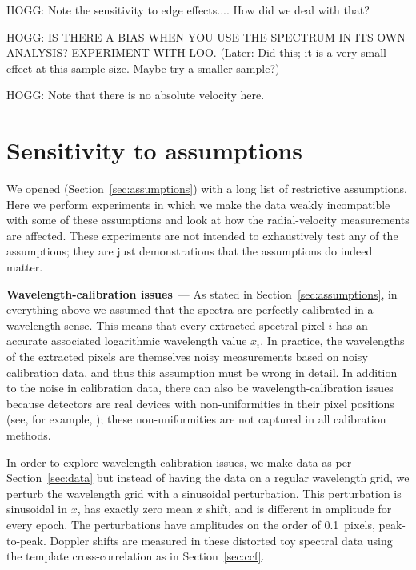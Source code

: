 \documentclass[modern]{aastex631}
\renewcommand{\paragraph}[1]{\bigskip\noindent\textbf{#1}~---}
\newcommand{\sectionname}{Section}
\newcommand{\secref}[1]{\sectionname~\ref{#1}}
\begin{document}
HOGG: Note the sensitivity to edge effects.... How did we deal with that?

HOGG: IS THERE A BIAS WHEN YOU USE THE SPECTRUM IN ITS OWN ANALYSIS? EXPERIMENT WITH LOO. (Later: Did this; it is a very small effect at this sample size. Maybe try a smaller sample?)

HOGG: Note that there is no absolute velocity here.

\section{Sensitivity to assumptions}\label{sec:sensitivity}

We opened (\secref{sec:assumptions}) with a long list of restrictive assumptions.
Here we perform experiments in which we make the data weakly incompatible with some of these assumptions and look at how the radial-velocity measurements are affected.
These experiments are not intended to exhaustively test any of the assumptions; they are just demonstrations that the assumptions do indeed matter.

\paragraph{Wavelength-calibration issues}
As stated in \secref{sec:assumptions}, in everything above we assumed that the spectra are perfectly calibrated in a wavelength sense.
This means that every extracted spectral pixel $i$ has an accurate associated logarithmic wavelength value $x_i$.
In practice, the wavelengths of the extracted pixels are themselves noisy measurements based on noisy calibration data, and thus this assumption must be wrong in detail.
In addition to the noise in calibration data, there can also be wavelength-calibration issues because detectors are real devices with non-uniformities in their pixel positions (see, for example, \citealt{excalibur}); these non-uniformities are not captured in all calibration methods.

In order to explore wavelength-calibration issues, we make data as per \secref{sec:data} but instead of having the data on a regular wavelength grid, we perturb the wavelength grid with a sinusoidal perturbation.
This perturbation is sinusoidal in $x$, has exactly zero mean $x$ shift, and is different in amplitude for every epoch.
The perturbations have amplitudes on the order of 0.1~pixels, peak-to-peak.
Doppler shifts are measured in these distorted toy spectral data using the template cross-correlation as in \secref{sec:ccf}.
\end{document}
